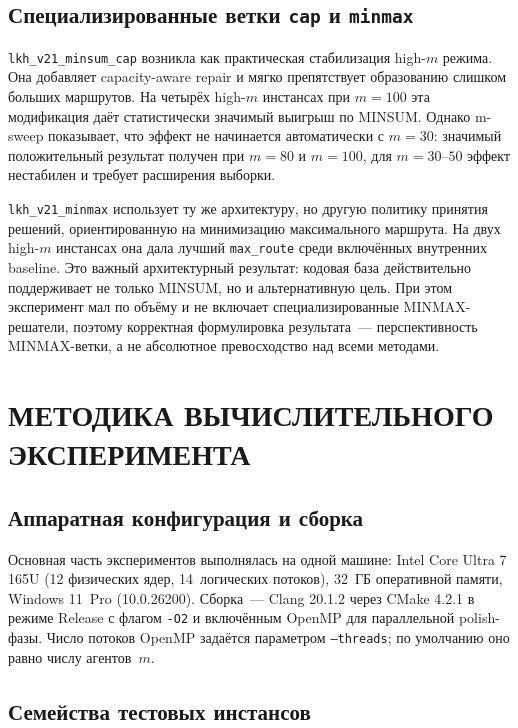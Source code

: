 \documentclass[14pt,a4paper]{extarticle}
\begin{document}
\subsection{Специализированные ветки \texttt{cap} и \texttt{minmax}}

\texttt{lkh\_v21\_minsum\_cap} возникла как практическая стабилизация high-$m$ режима. Она добавляет capacity-aware repair и мягко препятствует образованию слишком больших маршрутов. На четырёх high-$m$ инстансах при $m=100$ эта модификация даёт статистически значимый выигрыш по MINSUM. Однако m-sweep показывает, что эффект не начинается автоматически с $m=30$: значимый положительный результат получен при $m=80$ и $m=100$, для $m=30$--$50$ эффект нестабилен и требует расширения выборки.

\texttt{lkh\_v21\_minmax} использует ту же архитектуру, но другую политику принятия решений, ориентированную на минимизацию максимального маршрута. На двух high-$m$ инстансах она дала лучший \texttt{max\_route} среди включённых внутренних baseline. Это важный архитектурный результат: кодовая база действительно поддерживает не только MINSUM, но и альтернативную цель. При этом эксперимент мал по объёму и не включает специализированные MINMAX-решатели, поэтому корректная формулировка результата~--- перспективность MINMAX-ветки, а не абсолютное превосходство над всеми методами.

\section{МЕТОДИКА ВЫЧИСЛИТЕЛЬНОГО ЭКСПЕРИМЕНТА}

\subsection{Аппаратная конфигурация и сборка}

Основная часть экспериментов выполнялась на одной машине: Intel Core Ultra 7 165U (12 физических ядер, 14~логических потоков), 32~ГБ оперативной памяти, Windows 11~Pro (10.0.26200). Сборка~--- Clang 20.1.2 через CMake 4.2.1 в режиме Release с флагом \texttt{-O2} и включённым OpenMP для параллельной polish-фазы. Число потоков OpenMP задаётся параметром \texttt{--threads}; по умолчанию оно равно числу агентов~$m$.

\subsection{Семейства тестовых инстансов}
\end{document}
